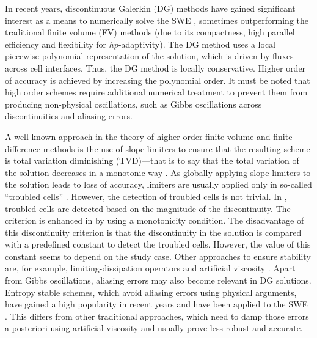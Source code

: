 In recent years, discontinuous Galerkin (DG) methods have gained significant interest as a means to numerically solve the SWE \cite{CaviedesVoullieme2015, kesserwani2015,  Vater20151, Marras:2016, Kesserwani2019, Vater2019,  CaviedesVoullieme2020, NavasMontilla2020}, sometimes outperforming the traditional finite volume (FV) methods (due to its compactness, high parallel efficiency and flexibility for $hp$-adaptivity).  The DG method uses a local piecewise-polynomial representation of the solution, which is driven by fluxes across cell interfaces.  Thus, the DG method is locally conservative.  Higher order of accuracy is achieved by increasing the polynomial order. It must be noted that high order schemes require additional numerical treatment to prevent them from producing non-physical oscillations, such as Gibbs oscillations across discontinuities and aliasing errors.

A well-known approach in the theory of higher order finite volume and finite difference methods is the use of slope limiters to ensure that the resulting scheme is total variation diminishing (TVD)---that is to say that the total variation of the solution decreases in a monotonic way \cite{leveque2}.  As globally applying slope limiters to the
solution leads to loss of accuracy, limiters are usually applied only in so-called ``troubled cells'' \cite{krivodonova2004, shu2005}. However, the detection of troubled cells is not trivial.  In \cite{Ambati2007452, krivodonova2004}, troubled cells are detected based on the magnitude of the discontinuity. The criterion is enhanced in \cite{kesserwani2015} by using a monotonicity condition.  The disadvantage of this discontinuity criterion is that the discontinuity in the solution is compared with a predefined constant to detect the troubled cells. However, the value of this constant seems to depend on the study case.  Other approaches to ensure stability are, for example, limiting-dissipation operators \cite{JAFFRE1995,  Ambati2007452} and artificial viscosity \cite{cesenek2013,  bublik2011, Bublik2015329}. Apart from Gibbs oscillations, aliasing errors may also become relevant in DG solutions. Entropy stable schemes, which avoid aliasing errors using physical arguments, have gained a high popularity in recent years \cite{GASSNER20162,MANZANERO2020}and have been applied to the SWE \cite{GASSNER2016,WINTERMEYER2018}. This differs from other traditional approaches, which need to damp those errors a posteriori using artificial viscosity and usually prove less robust and accurate. 

